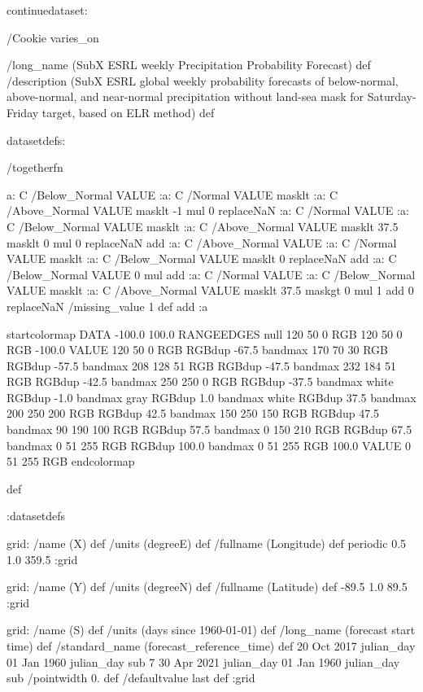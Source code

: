 \begin{ingrid}

continuedataset:



/Cookie varies_on


/long_name (SubX ESRL weekly Precipitation Probability Forecast) def
/description (SubX ESRL global weekly probability forecasts of below-normal, above-normal, and near-normal precipitation without land-sea mask for Saturday-Friday target, based on ELR method) def

datasetdefs:

/togetherfn {
 a:
    C /Below_Normal VALUE
    :a:
     C /Normal VALUE
     masklt
    :a:
     C /Above_Normal VALUE
     masklt
    -1 mul
    0 replaceNaN
    :a:
     C /Normal VALUE
     :a:
      C /Below_Normal VALUE
      masklt
     :a:
      C /Above_Normal VALUE
      masklt
     37.5 masklt
     0 mul
     0 replaceNaN           
     add
    :a:
     C /Above_Normal VALUE
     :a:
      C /Normal VALUE
      masklt
     :a:
      C /Below_Normal VALUE
      masklt
     0 replaceNaN
     add
 :a:
     C /Below_Normal VALUE
     0 mul
     add
    :a:
     C /Normal VALUE
     :a:
      C /Below_Normal VALUE
      masklt
     :a:
      C /Above_Normal VALUE        
      masklt
     37.5 maskgt
     0 mul
     1 add
     0 replaceNaN
     /missing_value 1 def
     add
    :a

startcolormap
DATA -100.0 100.0 RANGEEDGES
null 120 50 0 RGB
120 50 0 RGB -100.0 VALUE
120 50 0 RGB RGBdup -67.5 bandmax
170 70 30 RGB RGBdup -57.5 bandmax
208 128 51 RGB RGBdup -47.5 bandmax
232 184 51 RGB RGBdup -42.5 bandmax
250 250 0 RGB RGBdup -37.5 bandmax
white RGBdup -1.0 bandmax
gray RGBdup 1.0 bandmax
white RGBdup 37.5 bandmax
200 250 200 RGB RGBdup 42.5 bandmax
150 250 150 RGB RGBdup 47.5 bandmax
90 190 100 RGB RGBdup 57.5 bandmax
0 150 210 RGB RGBdup 67.5 bandmax
0 51 255 RGB RGBdup 100.0 bandmax
0 51 255 RGB 100.0 VALUE
0 51 255 RGB
endcolormap
} def 

:datasetdefs


grid:
/name (X) def
/units (degreeE) def
/fullname (Longitude) def
periodic
0.5 1.0 359.5
:grid

grid:
/name (Y) def
/units (degreeN) def
/fullname (Latitude) def
-89.5 1.0 89.5
:grid


grid:
/name (S) def
/units (days since 1960-01-01) def
/long_name (forecast start time) def
/standard_name (forecast_reference_time) def
20 Oct 2017 julian_day 01 Jan 1960 julian_day sub
7
30 Apr 2021 julian_day 01 Jan 1960 julian_day sub
/pointwidth 0. def
/defaultvalue { last } def
:grid


\end{ingrid}
